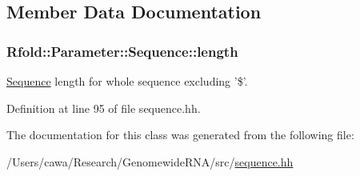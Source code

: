 \subsection{Member Data Documentation}
\hypertarget{class_rfold_1_1_parameter_1_1_sequence_aa9e3bfb9862ce32ecc4ab2260e4dd40c}{
\subsubsection[{length}]{ Rfold\+::\+Parameter\+::\+Sequence\+::length}}\label{class_rfold_1_1_parameter_1_1_sequence_aa9e3bfb9862ce32ecc4ab2260e4dd40c}
\hyperlink{class_rfold_1_1_parameter_1_1_sequence}{Sequence} length for whole sequence excluding '\$'. 

Definition at line 95 of file sequence.\+hh.



The documentation for this class was generated from the following file\+:\begin{DoxyCompactItemize}
\item 
/\+Users/cawa/\+Research/\+Genomewide\+R\+N\+A/src/\hyperlink{sequence_8hh}{sequence.\+hh}\end{DoxyCompactItemize}
